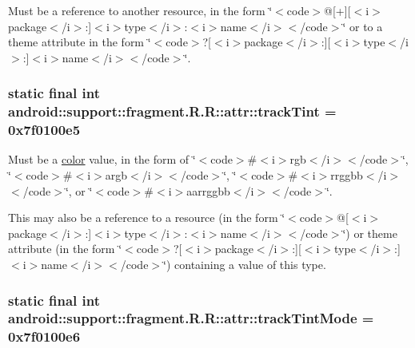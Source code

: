 Must be a reference to another resource, in the form \char`\"{}$<$code$>$@\mbox{[}+\mbox{]}\mbox{[}$<$i$>$package$<$/i$>$:\mbox{]}$<$i$>$type$<$/i$>$:$<$i$>$name$<$/i$>$$<$/code$>$\char`\"{} or to a theme attribute in the form \char`\"{}$<$code$>$?\mbox{[}$<$i$>$package$<$/i$>$:\mbox{]}\mbox{[}$<$i$>$type$<$/i$>$:\mbox{]}$<$i$>$name$<$/i$>$$<$/code$>$\char`\"{}. \hypertarget{classandroid_1_1support_1_1fragment_1_1_r_1_1attr_d4d347675284feb4302c139659c0bf19}{
\subsubsection[{trackTint}]{\setlength{\rightskip}{0pt plus 5cm}static final int android::support::fragment.R.R::attr::trackTint = 0x7f0100e5}}
\label{classandroid_1_1support_1_1fragment_1_1_r_1_1attr_d4d347675284feb4302c139659c0bf19}


Must be a \hyperlink{classandroid_1_1support_1_1fragment_1_1_r_1_1color}{color} value, in the form of \char`\"{}$<$code$>$\#$<$i$>$rgb$<$/i$>$$<$/code$>$\char`\"{}, \char`\"{}$<$code$>$\#$<$i$>$argb$<$/i$>$$<$/code$>$\char`\"{}, \char`\"{}$<$code$>$\#$<$i$>$rrggbb$<$/i$>$$<$/code$>$\char`\"{}, or \char`\"{}$<$code$>$\#$<$i$>$aarrggbb$<$/i$>$$<$/code$>$\char`\"{}. 

This may also be a reference to a resource (in the form \char`\"{}$<$code$>$@\mbox{[}$<$i$>$package$<$/i$>$:\mbox{]}$<$i$>$type$<$/i$>$:$<$i$>$name$<$/i$>$$<$/code$>$\char`\"{}) or theme attribute (in the form \char`\"{}$<$code$>$?\mbox{[}$<$i$>$package$<$/i$>$:\mbox{]}\mbox{[}$<$i$>$type$<$/i$>$:\mbox{]}$<$i$>$name$<$/i$>$$<$/code$>$\char`\"{}) containing a value of this type. \hypertarget{classandroid_1_1support_1_1fragment_1_1_r_1_1attr_b27c8e40ba55504ce5d1baa1fd963e95}{
\subsubsection[{trackTintMode}]{\setlength{\rightskip}{0pt plus 5cm}static final int android::support::fragment.R.R::attr::trackTintMode = 0x7f0100e6}}
\label{classandroid_1_1support_1_1fragment_1_1_r_1_1attr_b27c8e40ba55504ce5d1baa1fd963e95}


